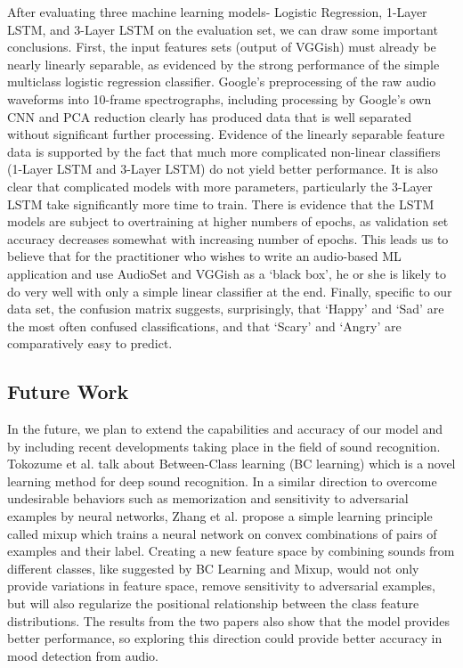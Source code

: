 \documentclass{article}
\begin{document}
After evaluating three machine learning models- Logistic Regression, 1-Layer LSTM, and 3-Layer LSTM on the evaluation set, we can draw some important conclusions. First, the input features sets (output of VGGish) must already be nearly linearly separable, as evidenced by the strong performance of the simple multiclass logistic regression classifier. Google’s preprocessing of the raw audio waveforms into 10-frame spectrographs, including processing by Google’s own CNN and PCA reduction clearly has produced data that is well separated without significant further processing. Evidence of the linearly separable feature data is supported by the fact that much more complicated non-linear classifiers (1-Layer LSTM and 3-Layer LSTM) do not yield better performance. It is also clear that complicated models with more parameters, particularly the 3-Layer LSTM take significantly more time to train. There is evidence that the LSTM models are subject to overtraining at higher numbers of epochs, as validation set accuracy decreases somewhat with increasing number of epochs. This leads us to believe that for the practitioner who wishes to write an audio-based ML application and use AudioSet and VGGish as a `black box', he or she is likely to do very well with only a simple linear classifier at the end. Finally, specific to our data set, the confusion matrix suggests, surprisingly, that ‘Happy’ and ‘Sad’ are the most often confused classifications, and that ‘Scary’ and ‘Angry’ are comparatively easy to predict. 

\subsection{Future Work}

In the future, we plan to extend the capabilities and accuracy of our model and by including recent developments taking place in the field of sound recognition. Tokozume et al. \cite{tokozume} talk about Between-Class learning (BC learning) which is a novel learning method for deep sound recognition. In a similar direction to overcome undesirable behaviors such as memorization and sensitivity to adversarial examples by neural networks, Zhang et al. \cite{zhang} propose  a simple learning principle called mixup which trains a neural network on convex combinations of pairs of examples and their label. Creating a new feature space by combining sounds from different classes, like suggested by BC Learning and Mixup, would not only provide variations in feature space, remove sensitivity to adversarial examples, but will also regularize the positional relationship between the class feature distributions. The results from the two papers also show that the model provides better performance, so exploring this direction could provide better accuracy in mood detection from audio. 
\end{document}
